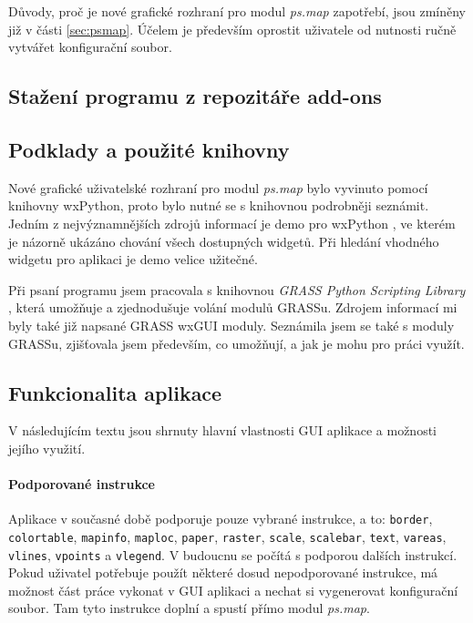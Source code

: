 \documentclass[a4paper,12pt,draft]{article}
\newcommand{\modul}[1]{\emph{#1}}
\newcommand{\instr}[1]{\lstinline[style=psmapInline]|#1|}
\begin{document}
Důvody, proč je nové grafické rozhraní pro modul \modul{ps.map} zapotřebí, jsou zmíněny již v části \ref{sec:psmap}. Účelem je především oprostit uživatele od nutnosti ručně vytvářet konfigurační soubor. 

\subsection{Stažení programu z repozitáře add-ons}
\subsection{Podklady a použité knihovny}
Nové grafické uživatelské rozhraní pro modul \modul{ps.map} bylo vyvinuto pomocí knihovny wxPython, 
proto bylo nutné se s knihovnou podrobněji seznámit. Jedním z nejvýznamnějších zdrojů informací je demo pro wxPython \cite{demo}, ve kterém je názorně ukázáno chování všech dostupných widgetů. Při hledání vhodného widgetu pro aplikaci je demo velice užitečné. 

Při psaní programu jsem pracovala s knihovnou \emph{GRASS Python Scripting Library} \cite{script}, která umožňuje a zjednodušuje volání modulů GRASSu. Zdrojem informací mi byly také již napsané GRASS wxGUI moduly. Seznámila jsem se také s moduly GRASSu, zjišťovala jsem především, co umožňují, a jak je mohu pro práci využít. 

\subsection{Funkcionalita aplikace}
V následujícím textu jsou shrnuty hlavní vlastnosti GUI aplikace a možnosti jejího využití.
\paragraph*{Podporované instrukce}
    Aplikace v současné době podporuje pouze vybrané instrukce, a to: \instr{border}, \instr{colortable}, \instr{mapinfo}, \instr{maploc}, \instr{paper}, \instr{raster}, \instr{scale}, \instr{scalebar}, \instr{text}, \instr{vareas}, \instr{vlines}, \instr{vpoints} a \instr{vlegend}. V budoucnu se počítá s podporou dalších instrukcí. Pokud uživatel potřebuje použít některé dosud nepodporované instrukce, má možnost část práce vykonat v GUI aplikaci a nechat si vygenerovat konfigurační soubor. Tam tyto instrukce doplní a spustí přímo modul \modul{ps.map}.
\end{document}
